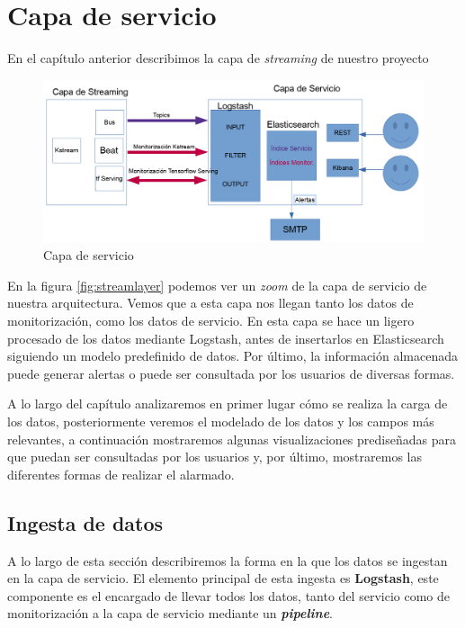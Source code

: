 \chapter{Capa de servicio}
\label{chapter:servicio}

En el capítulo anterior describimos la capa de \textit{streaming} de nuestro proyecto 


\begin{figure}[!ht]
	\centering
	\includegraphics[width=1\textwidth]{images/serv/servicelayer}
	\caption{Capa de servicio}
	\label{fig:servicelayer}
\end{figure}


En la figura \ref{fig:streamlayer} podemos ver un \textit{zoom} de la capa de servicio de nuestra arquitectura. Vemos que a esta capa nos llegan tanto los datos de monitorización, como los datos de servicio. En esta capa se hace un ligero procesado de los datos mediante Logstash, antes de insertarlos en Elasticsearch siguiendo un modelo predefinido de datos. Por último, la información almacenada puede generar alertas o puede ser consultada por los usuarios de diversas formas.

A lo largo del capítulo analizaremos en primer lugar cómo se realiza la carga de los datos, posteriormente veremos el modelado de los datos y los campos más relevantes, a continuación mostraremos algunas visualizaciones prediseñadas para que puedan ser consultadas por los usuarios y, por último, mostraremos las diferentes formas de realizar el alarmado.


\section{Ingesta de datos}
A lo largo de esta sección describiremos la forma en la que los datos se ingestan en la capa de servicio. El elemento principal de esta ingesta es \textbf{Logstash}, este componente es el encargado de llevar todos los datos, tanto del servicio como de monitorización a la capa de servicio mediante un \textit{\textbf{pipeline}}. 

